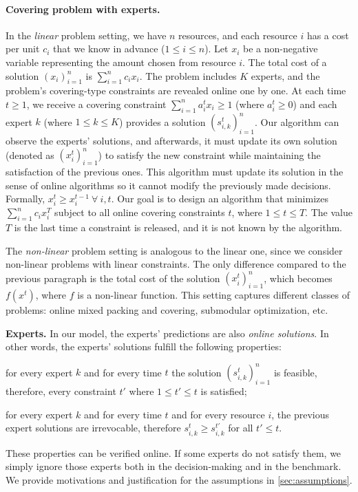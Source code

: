 \paragraph{Covering problem with experts.}
In the \emph{linear} problem setting, we have $n$ resources, and each resource $i$ has a cost per unit $c_{i}$ that we know in advance ($1 \leq i \leq n$).
Let $x_{i}$ be a non-negative variable representing the amount chosen from resource $i$.
The total cost of a solution $(x_{i})_{i=1}^{n}$ is $\sum_{i=1}^{n} c_{i} x_{i}$.
The problem includes $K$ experts, and the problem's covering-type constraints are revealed online one by one.
At each time $t \geq 1$, we receive a covering constraint $\sum_{i=1}^{n} a_{i}^{t} x_{i} \geq 1$ (where $a_{i}^{t} \geq 0$) and each expert $k$ (where $1 \leq k \leq K$) provides
a solution $(s_{i,k}^{t})_{i=1}^{n}$. Our algorithm can observe the experts' solutions, and afterwards, it must update its own solution (denoted as $(x_{i}^{t})_{i=1}^{n}$)
to satisfy the new constraint while maintaining the satisfaction of the previous ones. This algorithm must update its solution in the sense of online algorithms so it cannot modify the previously made decisions. Formally, $x_{i}^{t} \geq x_{i}^{t-1} ~\forall\ i, t$.
Our goal is to design an algorithm that minimizes $\sum_{i=1}^{n} c_{i} x_{i}^{T}$ subject to
all online covering constraints $t$, where $1 \leq t \leq T$. The value $T$ is the last time a constraint is released, and it is not known by the algorithm.

The \emph{non-linear} problem setting is analogous to the linear one, since we consider non-linear problems with linear constraints. The only difference compared to the previous paragraph is the total cost of the solution $(x_{i}^t)_{i=1}^{n}$, which becomes $f(x^t)$, where $f$ is a non-linear function. This setting captures different classes of problems: online mixed packing and covering, submodular optimization, etc.

\noindent \textbf{Experts.} \label{subsec:experts} In our model, the experts' predictions are also \emph{online solutions}. In other words, the experts' solutions
fulfill the following properties:
\begin{compactenum}
	\item for every expert $k$ and for every time $t$ the solution $(s_{i,k}^{t})_{i=1}^{n}$ is feasible, therefore, every constraint $t'$ where $1 \leq t' \leq t$ is satisfied;
	\item for every expert $k$ and for every time $t$ and for every resource $i$, the previous expert solutions are irrevocable, therefore $s_{i,k}^{t} \geq s_{i,k}^{t'}$ for all $t' \leq t$.
\end{compactenum}
These properties can be verified online. If some experts do not satisfy them, we simply ignore those experts both in the decision-making and in the benchmark.
We provide motivations and justification for the assumptions in \cref{sec:assumptions}.

